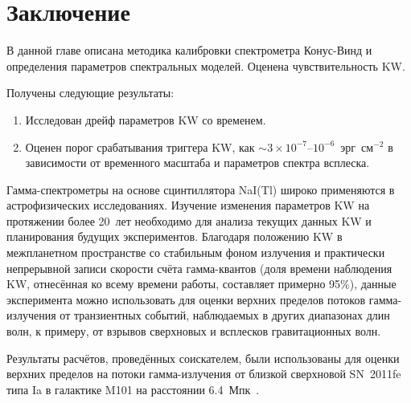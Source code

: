 \section{Заключение}
В данной главе описана методика калибровки спектрометра Конус-Винд и определения
параметров спектральных моделей. Оценена чувствительность KW. 

Получены следующие результаты:
\begin{enumerate}
\item Исследован дрейф параметров KW со временем.
\item Оценен порог срабатывания триггера KW, как $\sim 3\times10^{-7}$--$10^{-6}$~эрг~см$^{-2}$ 
в зависимости от временного масштаба и параметров спектра всплеска.
\end{enumerate}

Гамма-спектрометры на основе сцинтиллятора NaI(Tl) широко применяются в астрофизических исследованиях.
Изучение изменения параметров KW на протяжении более 20~лет 
необходимо для анализа текущих данных KW и планирования будущих экспериментов. 
Благодаря положению KW в межпланетном пространстве со стабильным 
фоном излучения и практически непрерывной записи скорости счёта гамма-квантов 
(доля времени наблюдения KW, отнесённая ко всему времени работы, составляет 
примерно 95\%), данные эксперимента 
можно использовать для оценки верхних пределов потоков гамма-излучения 
от транзиентных событий, наблюдаемых в других диапазонах длин волн, к примеру, 
от взрывов сверхновых и всплесков гравитационных волн.

Результаты расчётов, проведённых соискателем, были использованы для оценки верхних 
пределов на потоки гамма-излучения от близкой сверхновой SN~2011fe типа Ia в 
галактике M101 на расстоянии 6.4~Мпк~\citep{Margutti_2012ApJ}.

\clearpage